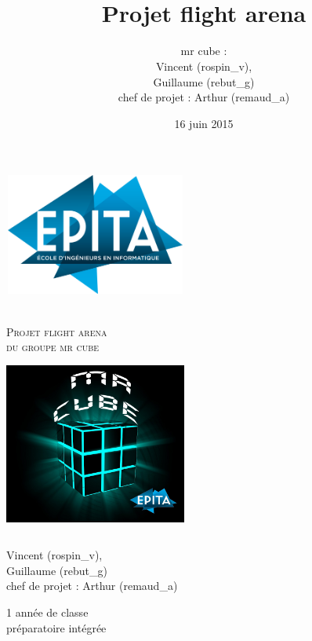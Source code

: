 \documentclass[12pt, titlepage]{article}
\title{\bsc{Rapport de projet}\\Projet flight arena}
\author{mr cube :\\
Vincent \bsc{Rospini-Clerici} (rospin\_v),\\
Guillaume \bsc{Rebut} (rebut\_g)\\
chef de projet : Arthur \bsc{Remaud} (remaud\_a)}
\date{16 juin 2015}
\begin{document}
\begin{spacing}{1.5}


\begin{titlepage}

\begin{flushright}
\includegraphics[height=4cm, width=6cm]{logo-epita.png}\\[2cm]
\end{flushright}

\begin{center}
\textsc{\LARGE {}}\\[1.5cm]

\textsc{\Large Projet flight arena}\\
\textsc{du groupe mr cube}\\[1.5cm]

\includegraphics[height=6cm, width=6cm]{MRCUBE.png}\\[1cm]

\begin{flushleft}
Vincent  (rospin\_v),\\
Guillaume  (rebut\_g)\\
chef de projet : Arthur  (remaud\_a)
\end{flushleft}

\begin{flushright}
1\ier{} année de classe\\ préparatoire intégrée
\end{flushright}


\end{center}
\end{titlepage}
\end{spacing}
\end{document}
